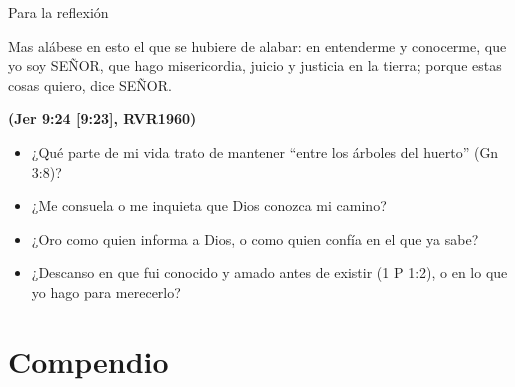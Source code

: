 \documentclass[hyperref={bookmarks=false},aspectratio=169]{beamer}
\newcommand{\SENOR}{S{\fontsize{0.78em}{1em}\selectfont EÑOR}}
\newcommand{\fuente}[1]{\par\hfill{\upshape\bfseries\footnotesize\textcolor{azul}{#1}}}
\begin{document}
\begin{frame}{Para la reflexión}
\begin{cita}Mas alábese en esto el que se hubiere de alabar: en entenderme y conocerme, que yo soy \SENOR{}, que hago misericordia, juicio y justicia en la tierra; porque estas cosas quiero, dice \SENOR{}.\fuente{(Jer 9:24 [9:23], RVR1960)}\end{cita}
\small
\begin{itemize}
\item ¿Qué parte de mi vida trato de mantener ``entre los árboles del huerto'' (Gn 3:8)?
\item ¿Me consuela o me inquieta que Dios conozca mi camino?
\item ¿Oro como quien informa a Dios, o como quien confía en el que ya sabe?
\item ¿Descanso en que fui conocido y amado antes de existir (1 P 1:2), o en lo que yo hago para merecerlo?
\end{itemize}
\end{frame}

\section{Compendio}
\end{document}
